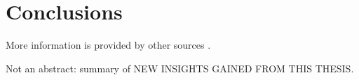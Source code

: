 \chapter{Conclusions}
\label{ch:conclusion}
{
More information is provided by other sources \cite{mittelbach2004latex, goossens1994latex}.
}

Not an abstract: summary of NEW INSIGHTS GAINED FROM THIS THESIS.
